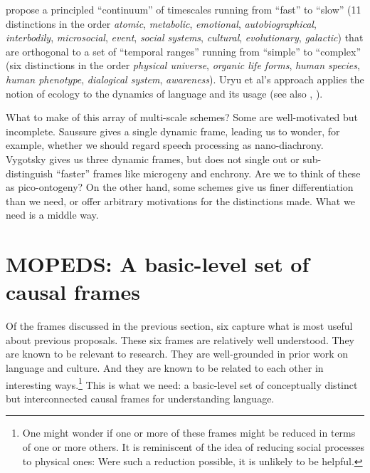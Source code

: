\citet{uryu_ecology_2014} propose a principled ``continuum'' of timescales running from 
``fast'' to ``slow'' (11 distinctions in the order \textit{atomic}, 
\textit{metabolic}, \textit{emotional}, \textit{autobiographical}, \textit{interbodily}, \textit{microsocial}, \textit{event}, 
\textit{social systems}, \textit{cultural}, \textit{evolutionary}, \textit{galactic}) that are orthogonal to a set of ``temporal 
ranges'' running from ``simple'' to ``complex'' (six distinctions in the 
order \textit{physical universe}, \textit{organic life forms}, 
\textit{human species}, \textit{human phenotype}, \textit{
dialogical system}, \textit{awareness}). Uryu et al's approach 
applies the notion of ecology to the dynamics of language and its usage (see also \citealt{cowley_distributed_2011}, \citealt{steffenson_ecolinguistics:_2013}).



What to make of this array of multi-scale schemes? Some are well-motivated but incomplete. Saussure gives 
a single dynamic frame, leading us to wonder, for example, whether we 
should regard speech processing as nano-diachrony. Vygotsky gives us three dynamic frames, but does not single out or 
sub-distinguish ``faster'' frames like microgeny and enchrony. Are we to 
think of these as pico-ontogeny? On the other hand, some schemes give us 
finer differentiation than we need, or offer arbitrary 
motivations for the distinctions made. What we need is a middle way. 



\section{MOPEDS: A basic-level set of causal frames}

Of the frames discussed in the previous section, six capture 
what is most useful about previous proposals. These six frames are relatively well understood. They are known to be 
relevant to research. They are well-grounded in prior work on language and 
culture. And they are known to be related to each other in interesting ways.\footnote{One might wonder if one or more of these frames might be reduced in terms of one or more others. It is reminiscent of the idea of reducing social processes to physical ones: Were such a reduction possible, it is unlikely to be helpful.} This is what we need: a basic-level set of conceptually 
distinct but interconnected causal frames for understanding language. 



